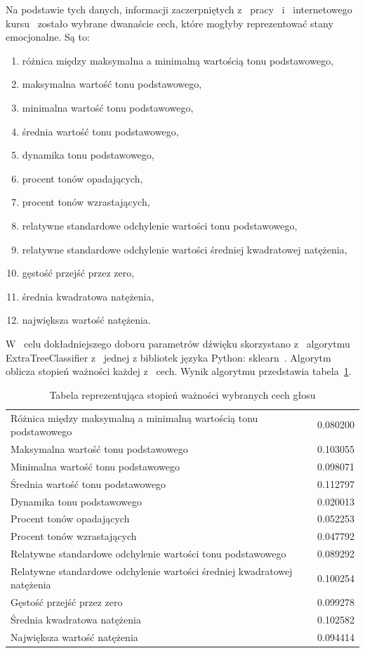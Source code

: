 \documentclass[declaration,shortabstract]{iithesis}
\begin{document}
Na podstawie tych danych, informacji zaczerpniętych z~ pracy~\cite{Akustyka} i~ internetowego kursu~\cite{Waveform} zostało wybrane dwanaście cech, które mogłyby reprezentować stany emocjonalne.
Są to: 
\begin{enumerate}
\item różnica między maksymalna a minimalną wartością tonu podstawowego,
\item maksymalna wartość tonu podstawowego,
\item minimalna wartość tonu podstawowego,
\item średnia wartość tonu podstawowego,
\item dynamika tonu podstawowego,
\item procent tonów opadających,
\item procent tonów wzrastających,
\item relatywne standardowe odchylenie wartości tonu podstawowego,
\item relatywne standardowe odchylenie wartości średniej kwadratowej natężenia,
\item gęstość przejść przez zero,
\item średnia kwadratowa natężenia,
\item największa wartość natężenia.
\end{enumerate}

W~ celu dokładniejszego doboru parametrów dźwięku skorzystano z~ algorytmu ExtraTreeClassifier z~ jednej z bibliotek języka Python: sklearn~\cite{sklearn}. Algorytm oblicza stopień ważności każdej z~ cech. Wynik algorytmu przedstawia tabela~\ref{TWaznosc_cech}.

\begin{table}[H]
\caption{Tabela reprezentująca stopień ważności wybranych cech głosu}
\begin{tabular}{ l | r }
\label{TWaznosc_cech}
Różnica między maksymalną a minimalną wartością tonu podstawowego & 0.080200 \\
Maksymalna wartość tonu podstawowego & 0.103055 \\
Minimalna wartość tonu podstawowego & 0.098071 \\
Średnia wartość tonu podstawowego & 0.112797 \\
Dynamika tonu podstawowego & 0.020013 \\
Procent tonów opadających & 0.052253 \\
Procent tonów wzrastających & 0.047792 \\
Relatywne standardowe odchylenie wartości tonu podstawowego & 0.089292 \\
Relatywne standardowe odchylenie wartości średniej kwadratowej natężenia & 0.100254 \\
Gęstość przejść przez zero & 0.099278 \\
Średnia kwadratowa natężenia & 0.102582 \\
Największa wartość natężenia & 0.094414 \\
\end{tabular}
\end{table}
\end{document}
